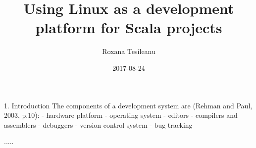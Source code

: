 \documentclass{article}
\title{Using Linux as a development platform for Scala projects}
\date{2017-08-24}
\author{Roxana Tesileanu}
\begin{document}
	\maketitle
	\newpage
1. Introduction
\newline
The components of a development system are (Rehman and Paul, 2003, p.10):\newline
- hardware platform \newline
- operating system \newline
- editors \newline
- compilers and assemblers \newline
- debuggers \newline
- version control system \newline
- bug tracking \newline

.....
  
\end{document}
